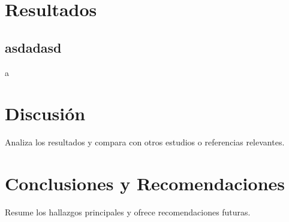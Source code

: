 \documentclass[12pt]{report}
\begin{document}
\chapter{Resultados}
\section{asdadasd}
a

\chapter{Discusión}
Analiza los resultados y compara con otros estudios o referencias relevantes.

\chapter{Conclusiones y Recomendaciones}
Resume los hallazgos principales y ofrece recomendaciones futuras.
\end{document}

